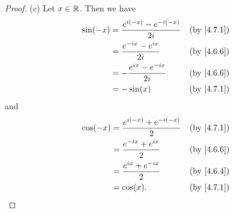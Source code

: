 \begin{proof}{(c)}
  Let \(x \in \mathbb{R}\).
  Then we have
  \begin{align*}
    \sin(-x) & = \dfrac{e^{i (-x)} - e^{- i (-x)}}{2i} &  & \by{4.7.1} \\
             & = \dfrac{e^{- i x} - e^{i x}}{2i}       &  & \by{4.6.6} \\
             & = -\dfrac{e^{i x} - e^{- i x}}{2i}      &  & \by{4.6.6} \\
             & = -\sin(x)                              &  & \by{4.7.1}
  \end{align*}
  and
  \begin{align*}
    \cos(-x) & = \dfrac{e^{i (-x)} + e^{- i (-x)}}{2} &  & \by{4.7.1} \\
             & = \dfrac{e^{- i x} + e^{i x}}{2}       &  & \by{4.6.6} \\
             & = \dfrac{e^{i x} + e^{- i x}}{2}       &  & \by{4.6.4} \\
             & = \cos(x).                             &  & \by{4.7.1}
  \end{align*}
\end{proof}

